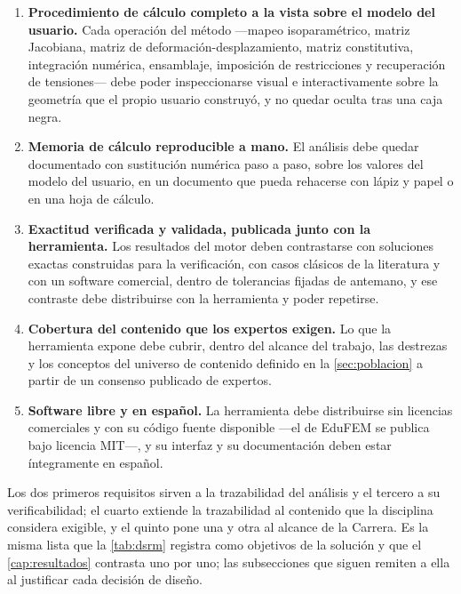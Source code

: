 \begin{enumerate}
    \item \textbf{Procedimiento de cálculo completo a la vista sobre el modelo del usuario.} Cada operación del método —mapeo isoparamétrico, matriz Jacobiana, matriz de deformación-desplazamiento, matriz constitutiva, integración numérica, ensamblaje, imposición de restricciones y recuperación de tensiones— debe poder inspeccionarse visual e interactivamente sobre la geometría que el propio usuario construyó, y no quedar oculta tras una caja negra.
    \item \textbf{Memoria de cálculo reproducible a mano.} El análisis debe quedar documentado con sustitución numérica paso a paso, sobre los valores del modelo del usuario, en un documento que pueda rehacerse con lápiz y papel o en una hoja de cálculo.
    \item \textbf{Exactitud verificada y validada, publicada junto con la herramienta.} Los resultados del motor deben contrastarse con soluciones exactas construidas para la verificación, con casos clásicos de la literatura y con un software comercial, dentro de tolerancias fijadas de antemano, y ese contraste debe distribuirse con la herramienta y poder repetirse.
    \item \textbf{Cobertura del contenido que los expertos exigen.} Lo que la herramienta expone debe cubrir, dentro del alcance del trabajo, las destrezas y los conceptos del universo de contenido definido en la \autoref{sec:poblacion} a partir de un consenso publicado de expertos.
    \item \textbf{Software libre y en español.} La herramienta debe distribuirse sin licencias comerciales y con su código fuente disponible ---el de EduFEM se publica bajo licencia MIT---, y su interfaz y su documentación deben estar íntegramente en español.
\end{enumerate}

Los dos primeros requisitos sirven a la trazabilidad del análisis y el tercero a su verificabilidad; el cuarto extiende la trazabilidad al contenido que la disciplina considera exigible, y el quinto pone una y otra al alcance de la Carrera. Es la misma lista que la \autoref{tab:dsrm} registra como objetivos de la solución y que el \autoref{cap:resultados} contrasta uno por uno; las subsecciones que siguen remiten a ella al justificar cada decisión de diseño.

